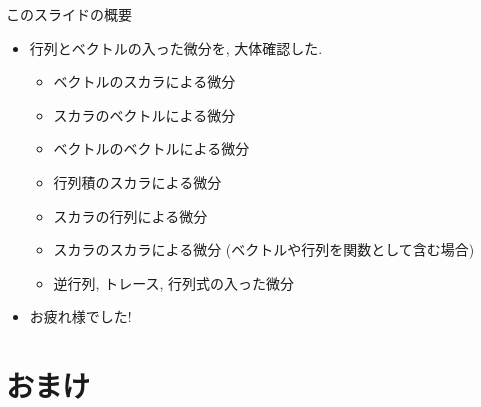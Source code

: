 \documentclass[dvipdfmx,notheorems,t]{beamer}
\begin{document}
\begin{frame}{このスライドの概要}
\begin{itemize}
  \item 行列とベクトルの入った微分を, 大体確認した.
  \begin{itemize}
    \item ベクトルのスカラによる微分
    \item スカラのベクトルによる微分
    \item ベクトルのベクトルによる微分
    \item 行列積のスカラによる微分
    \item スカラの行列による微分
    \item スカラのスカラによる微分 (ベクトルや行列を関数として含む場合)
    \item 逆行列, トレース, 行列式の入った微分
  \end{itemize}
  \item お疲れ様でした!
\end{itemize}
\end{frame}

\section{おまけ}
\end{document}

